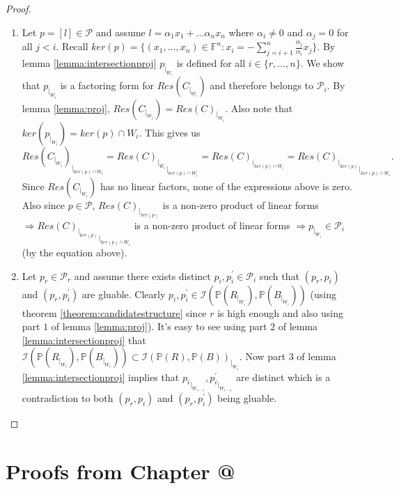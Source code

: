 \documentclass[12pt]{caltech_thesis}
\makeatletter
\theoremstyle{plain}
\theoremstyle{definition}
\newcommand{\F}{\mathbb{F}}
\newcommand{\MP}{\mathcal{P}}
\newcommand{\MI}{\mathcal{I}}
\newcommand{\PP}{\mathbb{P}}
\newcommand*{\rom}[1]{\expandafter\@slowromancap\romannumeral #1@}
\makeatother
\begin{document}
\begin{proof}
\begin{enumerate}
 \item Let $p=[l]\in \MP$ and assume $l=\alpha_1x_1 + \ldots \alpha_nx_n$ where $\alpha_i\neq 0$ and $\alpha_j=0$ for all $j<i$.  
 Recall $ker(p) = \{(x_1,\ldots,x_n)\in \F^n : x_i = -\sum\limits_{j=i+1}^n \frac{\alpha_j}{\alpha_i}x_j \}$. By lemma 
 \ref{lemma:intersectionproj} $p_{|_{W_i}}$ is defined for all $i\in \{r,\ldots,n\}$. We show that $p_{|_{W_i}}$ is a factoring form for
 $Res(C_{|_{W_i}})$ and therefore belongs to $\MP_i$. By lemma \ref{lemma:proj}, $Res(C_{|_{W_i}}) = Res(C)_{|_{W_i}}$. Also note that
 $ker(p_{|_{W_i}}) = ker(p)\cap W_i$. This gives us
 \[
  Res(C_{|_{W_i}})_{|_{ker(p)\cap W_i}} = {Res(C)_{|_{W_i}}}_{|_{ker(p)\cap W_i}} = Res(C)_{|_{ker(p)\cap W_i}} = 
  {Res(C)_{|_{ker(p)}}}_{|_{ker(p)\cap W_i}}.
 \]
 Since $Res(C_{|_{W_i}})$ has no linear factors, none of the expressions above is zero.
Also since $p\in \MP$, $Res(C)_{|_{ker(p)}}$ is a non-zero product of linear forms $\Rightarrow
{Res(C)_{|_{ker(p)}}}_{|_{ker(p)\cap W_i}}$ is a non-zero product of linear forms $\Rightarrow p_{|_{W_i}} \in \MP_i$ (by the equation above).
\item Let $p_r\in \MP_r$ and assume there exists distinct $p_i,p_i^\prime \in \MP_i$ such that $(p_r,p_i)$ and $(p_r,p_i^\prime)$
are gluable. Clearly $p_i,p_i^\prime \in \MI(\PP(R_{|_{W_i}}), \PP(B_{|_{W_i}}))$ (using theorem \ref{theorem:candidatestructure} 
since $r$ is high enough and also using part $1$ of lemma \ref{lemma:proj}). It's easy to see using part $2$ of lemma \ref{lemma:intersectionproj}
that $\MI(\PP(R_{|_{W_i}}), \PP(B_{|_{W_i}})) \subset \MI(\PP(R),\PP(B))_{|_{W_i}}$.
Now part $3$ of lemma \ref{lemma:intersectionproj}
implies that ${p_i}_{|_{W_{r-1}}}, {p_i^\prime}_{|_{W_{r-1}}}$ are distinct which is a contradiction to both $(p_r,p_{i})$
and $(p_r,p_i^\prime)$ being gluable.
\end{enumerate}

\end{proof}




\chapter{Proofs from Chapter \rom{5}}\label{appendix:proofsfromcharzero}
\end{document}
